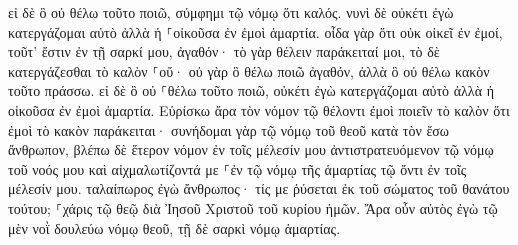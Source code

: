 \documentclass{openreader}
\begin{document}
εἰ δὲ ὃ οὐ θέλω τοῦτο ποιῶ, σύμφημι τῷ νόμῳ ὅτι καλός. 
νυνὶ δὲ οὐκέτι ἐγὼ κατεργάζομαι αὐτὸ ἀλλὰ ἡ ⸀οἰκοῦσα ἐν ἐμοὶ ἁμαρτία. 
οἶδα γὰρ ὅτι οὐκ οἰκεῖ ἐν ἐμοί, τοῦτ’ ἔστιν ἐν τῇ σαρκί μου, ἀγαθόν· τὸ γὰρ θέλειν παράκειταί μοι, τὸ δὲ κατεργάζεσθαι τὸ καλὸν ⸀οὔ· 
οὐ γὰρ ὃ θέλω ποιῶ ἀγαθόν, ἀλλὰ ὃ οὐ θέλω κακὸν τοῦτο πράσσω. 
εἰ δὲ ὃ οὐ ⸀θέλω τοῦτο ποιῶ, οὐκέτι ἐγὼ κατεργάζομαι αὐτὸ ἀλλὰ ἡ οἰκοῦσα ἐν ἐμοὶ ἁμαρτία. 
Εὑρίσκω ἄρα τὸν νόμον τῷ θέλοντι ἐμοὶ ποιεῖν τὸ καλὸν ὅτι ἐμοὶ τὸ κακὸν παράκειται· 
συνήδομαι γὰρ τῷ νόμῳ τοῦ θεοῦ κατὰ τὸν ἔσω ἄνθρωπον, 
βλέπω δὲ ἕτερον νόμον ἐν τοῖς μέλεσίν μου ἀντιστρατευόμενον τῷ νόμῳ τοῦ νοός μου καὶ αἰχμαλωτίζοντά με ⸀ἐν τῷ νόμῳ τῆς ἁμαρτίας τῷ ὄντι ἐν τοῖς μέλεσίν μου. 
ταλαίπωρος ἐγὼ ἄνθρωπος· τίς με ῥύσεται ἐκ τοῦ σώματος τοῦ θανάτου τούτου; 
⸀χάρις τῷ θεῷ διὰ Ἰησοῦ Χριστοῦ τοῦ κυρίου ἡμῶν. Ἄρα οὖν αὐτὸς ἐγὼ τῷ μὲν νοῒ δουλεύω νόμῳ θεοῦ, τῇ δὲ σαρκὶ νόμῳ ἁμαρτίας. 
\end{document}
